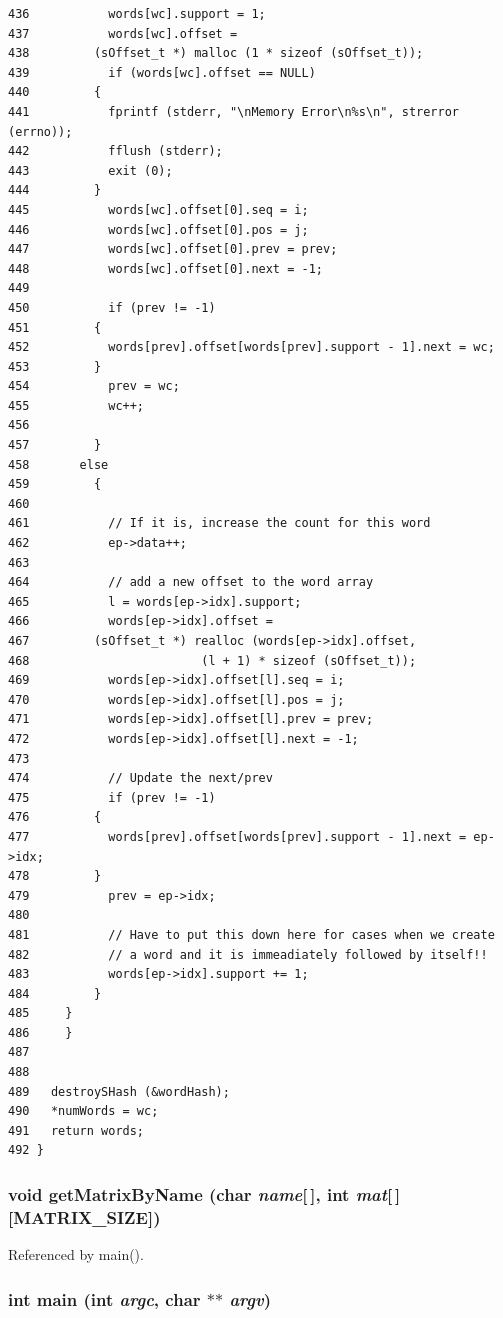 \begin{verbatim}
436           words[wc].support = 1;
437           words[wc].offset =
438         (sOffset_t *) malloc (1 * sizeof (sOffset_t));
439           if (words[wc].offset == NULL)
440         {
441           fprintf (stderr, "\nMemory Error\n%s\n", strerror (errno));
442           fflush (stderr);
443           exit (0);
444         }
445           words[wc].offset[0].seq = i;
446           words[wc].offset[0].pos = j;
447           words[wc].offset[0].prev = prev;
448           words[wc].offset[0].next = -1;
449 
450           if (prev != -1)
451         {
452           words[prev].offset[words[prev].support - 1].next = wc;
453         }
454           prev = wc;
455           wc++;
456 
457         }
458       else
459         {
460 
461           // If it is, increase the count for this word
462           ep->data++;
463 
464           // add a new offset to the word array
465           l = words[ep->idx].support;
466           words[ep->idx].offset =
467         (sOffset_t *) realloc (words[ep->idx].offset,
468                        (l + 1) * sizeof (sOffset_t));
469           words[ep->idx].offset[l].seq = i;
470           words[ep->idx].offset[l].pos = j;
471           words[ep->idx].offset[l].prev = prev;
472           words[ep->idx].offset[l].next = -1;
473 
474           // Update the next/prev
475           if (prev != -1)
476         {
477           words[prev].offset[words[prev].support - 1].next = ep->idx;
478         }
479           prev = ep->idx;
480 
481           // Have to put this down here for cases when we create
482           // a word and it is immeadiately followed by itself!!
483           words[ep->idx].support += 1;
484         }
485     }
486     }
487 
488 
489   destroySHash (&wordHash);
490   *numWords = wc;
491   return words;
492 }
\end{verbatim}
\normalsize 


\hypertarget{gemoda-s_8c_a2}{
\subsubsection[getMatrixByName]{\setlength{\rightskip}{0pt plus 5cm}void get\-Matrix\-By\-Name (char {\em name}\mbox{[}$\,$\mbox{]}, int {\em mat}\mbox{[}$\,$\mbox{]}\mbox{[}MATRIX\_\-SIZE\mbox{]})}}
\label{gemoda-s_8c_a2}




Referenced by main().\hypertarget{gemoda-s_8c_a7}{
\subsubsection[main]{\setlength{\rightskip}{0pt plus 5cm}int main (int {\em argc}, char $\ast$$\ast$ {\em argv})}}
\label{gemoda-s_8c_a7}


